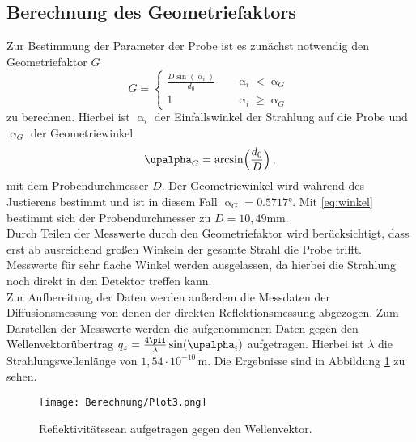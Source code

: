\subsection{Berechnung des Geometriefaktors}
Zur Bestimmung der Parameter der Probe ist es zunächst notwendig den Geometriefaktor $G$
\begin{equation}
  G =
     \begin{cases}
       \frac{D\sin\left(\upalpha_i\right)}{d_0} &\quad\upalpha_i<\upalpha_G\\
       1 &\quad\upalpha_i\geq\upalpha_G
     \end{cases}
\end{equation}
zu berechnen. Hierbei ist $\upalpha_i$ der Einfallswinkel der Strahlung auf die Probe und $\upalpha_G$ der Geometriewinkel
\begin{equation}
\upalpha_G=\arcsin\Bigl(\frac{d_0}{D}\Bigr)\,,
\label{eq:winkel}
\end{equation}
mit dem Probendurchmesser $D$.
Der Geometriewinkel wird während des Justierens bestimmt und ist in diesem Fall $\upalpha_G=0.5717°$.
Mit \eqref{eq:winkel} bestimmt sich der Probendurchmesser zu $D=10{,}49\si{\mm}$.\\
Durch Teilen der Messwerte durch den Geometriefaktor wird berücksichtigt, dass erst ab ausreichend großen Winkeln der gesamte Strahl die Probe trifft. Messwerte für sehr flache Winkel werden ausgelassen, da hierbei die Strahlung noch direkt in den Detektor treffen kann.\\
Zur Aufbereitung der Daten werden außerdem die Messdaten der Diffusionsmessung von denen der direkten Reflektionsmessung abgezogen. Zum Darstellen der Messwerte werden die aufgenommenen Daten gegen den Wellenvektorübertrag $q_z=\frac{4\pii}{\lambda}\sin(\upalpha_i)$ aufgetragen. Hierbei ist $\lambda$ die Strahlungswellenlänge von $1{,}54\cdot10^{-10}\,\si{\m}$. Die Ergebnisse sind in Abbildung \ref{Plot1} zu sehen.
\begin{figure}[H]
  \centering
  \texttt{[image: Berechnung/Plot3.png]}
  \caption{Reflektivitätsscan aufgetragen gegen den Wellenvektor.}
  \label{Plot1}
\end{figure}
